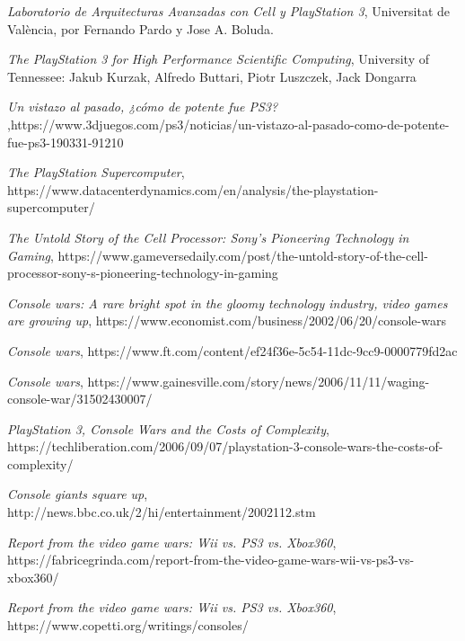 \documentclass[11pt,compsoc]{IEEEtran}
\begin{document}
	
		\begin{thebibliography}{1}
			
			{\it{Laboratorio de Arquitecturas Avanzadas con Cell y PlayStation 3}}, Universitat de València, por Fernando Pardo y Jose A. Boluda.
			
			{\it{The PlayStation 3 for High Performance Scientific Computing}}, University of Tennessee: Jakub Kurzak,		Alfredo Buttari, Piotr Luszczek, Jack Dongarra
			
			{\it{Un vistazo al pasado, ¿cómo de potente fue PS3? }},https://www.3djuegos.com/ps3/noticias/un-vistazo-al-pasado-como-de-potente-fue-ps3-190331-91210
		
			{\it{The PlayStation Supercomputer}}, https://www.datacenterdynamics.com/en/analysis/the-playstation-supercomputer/
			
			{\it{The Untold Story of the Cell Processor: Sony's Pioneering Technology in Gaming}}, https://www.gameversedaily.com/post/the-untold-story-of-the-cell-processor-sony-s-pioneering-technology-in-gaming
			
			{\it{Console wars: A rare bright spot in the gloomy technology industry, video games are growing up}}, 
			https://www.economist.com/business/2002/06/20/console-wars
			
			{\it{Console wars}}, 			https://www.ft.com/content/ef24f36e-5c54-11dc-9cc9-0000779fd2ac
			
			{\it{Console wars}}, 			
			https://www.gainesville.com/story/news/2006/11/11/waging-console-war/31502430007/
			
			{\it{PlayStation 3, Console Wars and the Costs of Complexity}}, 			
			https://techliberation.com/2006/09/07/playstation-3-console-wars-the-costs-of-complexity/
			
			{\it{Console giants square up}}, 			
			http://news.bbc.co.uk/2/hi/entertainment/2002112.stm
			
			{\it{Report from the video game wars: Wii vs. PS3 vs. Xbox360}}, 
			https://fabricegrinda.com/report-from-the-video-game-wars-wii-vs-ps3-vs-xbox360/
			
			{\it{Report from the video game wars: Wii vs. PS3 vs. Xbox360}}, 
			https://www.copetti.org/writings/consoles/
			
			

			
		
		\end{thebibliography}
		
			
	
		
\end{document}
